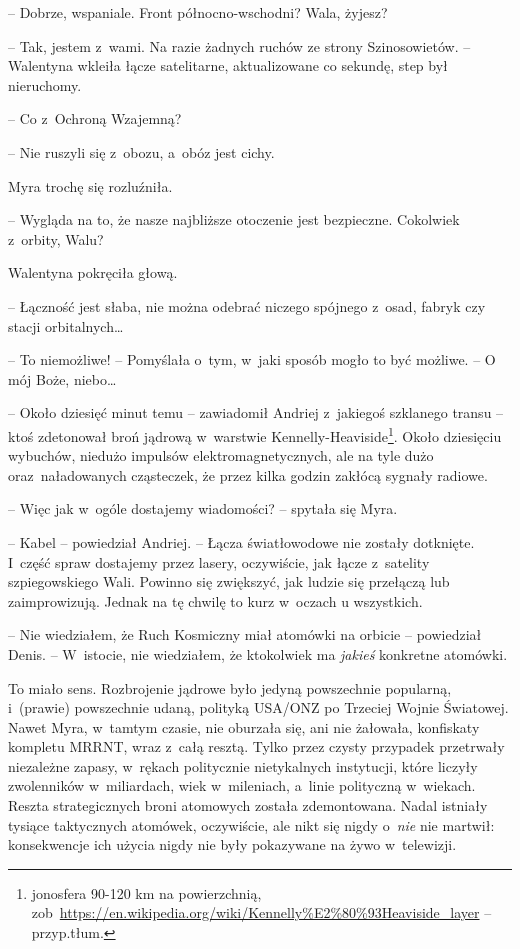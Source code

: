 \documentclass[oneside,polish,11pt,sfheadings]{mwbk}
\begin{document}
-- Dobrze, wspaniale. Front północno-wschodni? Wala, żyjesz?

-- Tak, jestem z~wami. Na razie żadnych ruchów ze strony Szinosowietów. -- Walentyna wkleiła łącze satelitarne, aktualizowane co sekundę, step był
nieruchomy.

-- Co z~Ochroną Wzajemną?

-- Nie ruszyli się z~obozu, a~obóz jest cichy.

Myra trochę się rozluźniła. 

-- Wygląda na to, że nasze najbliższe
otoczenie jest bezpieczne. Cokolwiek z~orbity, Walu?

Walentyna pokręciła głową. 

-- Łączność jest słaba, nie można odebrać
niczego spójnego z~osad, fabryk czy stacji orbitalnych\ldots

-- To niemożliwe! -- Pomyślała o~tym, w~jaki sposób mogło to być możliwe.
-- O mój Boże, niebo\ldots

-- Około dziesięć minut temu -- zawiadomił Andriej z~jakiegoś szklanego
transu -- ktoś zdetonował broń jądrową w~warstwie Kennelly-Heaviside\footnote{
jonosfera 90-120 km na powierzchnią,
zob~\url{https://en.wikipedia.org/wiki/Kennelly\%E2\%80\%93Heaviside\_layer}
-- przyp.tłum.}. Około dziesięciu wybuchów, niedużo impulsów
elektromagnetycznych, ale na tyle dużo oraz~naładowanych cząsteczek,
że przez kilka godzin zakłócą sygnały radiowe.

-- Więc jak w~ogóle dostajemy wiadomości? -- spytała się Myra.

-- Kabel -- powiedział Andriej. -- Łącza światłowodowe nie zostały
dotknięte. I~część spraw dostajemy przez lasery, oczywiście, jak łącze z~satelity szpiegowskiego Wali. Powinno się zwiększyć, jak ludzie się
przełączą lub zaimprowizują. Jednak na tę chwilę to kurz w~oczach u
wszystkich.

-- Nie wiedziałem, że Ruch Kosmiczny miał atomówki na orbicie -- powiedział Denis. -- W~istocie, nie wiedziałem, że ktokolwiek ma
\textit{jakieś} konkretne atomówki.

To miało sens. Rozbrojenie jądrowe było jedyną powszechnie popularną, i~(prawie) powszechnie udaną, polityką USA/ONZ po Trzeciej Wojnie
Światowej. Nawet Myra, w~tamtym czasie, nie oburzała się, ani nie
żałowała, konfiskaty kompletu MRRNT, wraz z~całą resztą. Tylko przez
czysty przypadek przetrwały niezależne zapasy, w~rękach politycznie
nietykalnych instytucji, które liczyły zwolenników w~miliardach, wiek w~mileniach, a~linie polityczną w~wiekach. Reszta strategicznych broni
atomowych została zdemontowana. Nadal istniały tysiące taktycznych
atomówek, oczywiście, ale nikt się nigdy o~\textit{nie} nie martwił:
konsekwencje ich użycia nigdy nie były pokazywane na żywo w~telewizji.
\end{document}
